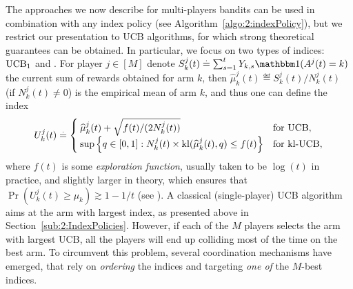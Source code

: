 


The approaches we now describe for multi-players bandits can be used in combination with any index policy (see Algorithm~\ref{algo:2:indexPolicy}), but we restrict our presentation to UCB algorithms, for which strong theoretical guarantees can be obtained. In particular, we focus on two types of indices:
$\mathrm{UCB}_1$ \citep{Auer02}
and \klUCB{} \citep{KLUCBJournal}.
For player $j\in[M]$
%
denote $S_k^j(t) \eqdef \sum_{s=1}^t Y_{k,s} \indic(A^j(t) = k)$ the current sum of rewards obtained for arm $k$,
then $\widehat{\mu}_k^j(t) \eqdef S_k^j(t)/N_k^j(t)$ (if $N_k^j(t)\neq 0$) is the empirical mean of arm $k$, and thus one can define the index
\begin{equation}\label{eq:5:indexFor_UCB_klUCB}
  U_k^j(t) \overset{.}{=} \begin{cases}
      \widehat{\mu}_k^j(t)  + \sqrt{  f(t) / (2N_k^j(t))}
      &\text{for } \mathrm{UCB}, \\
      \sup\left\{ q \in [0, 1]: N_k^j(t)\times \mathrm{kl}(\widehat{\mu}_k^j(t), q) \leq f(t) \right\}
      &\text{for } \mathrm{kl}\text{-}\mathrm{UCB},
  \end{cases}
\end{equation}
where $f(t)$ is some \emph{exploration function}, usually taken to be $\log(t)$ in practice, and slightly larger in theory, which ensures that  $\Pr(U_k^j(t) \geq \mu_k) \gtrsim 1 - 1/t$ (see \cite{KLUCBJournal}).
A classical (single-player) UCB algorithm aims at the arm with largest index, as presented above in Section~\ref{sub:2:IndexPolicies}.
However, if each of the $M$ players selects the arm with largest UCB, all the players will end up colliding most of the time on the best arm.
To circumvent this problem, several coordination mechanisms have emerged, that rely on \emph{ordering} the indices and targeting \emph{one of} the $M$-best indices.


